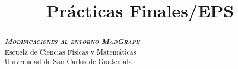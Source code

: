 \documentclass[osajnl,showpacs,superscriptaddress,10pt]{revtex4-2}
\begin{document}
\title{Prácticas Finales/EPS}
\begin{abstract}
    \begin{center}
        \vspace{300pt}
        \Large \textbf{\textit{\textsc{Modificaciones al entorno MadGraph}}} \normalsize
        \vspace{300pt}
        \\
        \Large Escuela de Ciencias Físicas y Matemáticas \normalsize
        \\
        \large Universidad de San Carlos de Guatemala \normalsize
    \end{center}
\end{abstract}
\maketitle

\pagestyle{fancy}
\fancyhf{}
\fancyfoot[LE,RO]{\hfill\thepage\hfill}
\renewcommand{\footruleskip}{3pt}
\renewcommand{\footrulewidth}{1pt}

\newpage
\tableofcontents
\newpage


\newpage

% 
% 
% 
% 

\end{document}
